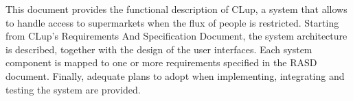 \documentclass[../../main.tex]{subfiles}
\begin{document}
This document provides the functional description of CLup, a system that allows
to handle access to supermarkets when the flux of people is restricted. Starting
from CLup's Requirements And Specification Document, the system architecture is
described, together with the design of the user interfaces. Each system
component is mapped to one or more requirements specified in the RASD document.
Finally, adequate plans to adopt when implementing, integrating and testing the
system are provided. 
\end{document}
